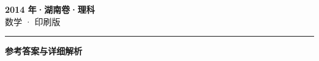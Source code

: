 \documentclass[zihao=5, a4paper]{ctexart}
\begin{document}
\begin{center}
  {\Large\bfseries 2014 年·湖南卷·理科}\\[4pt]
  {\large 数学 · 印刷版}
\end{center}
\medskip
{}

\par\bigskip\hrule\bigskip
{}
\Needspace{0.55\textheight}
\begin{center}{\large\bfseries 参考答案与详细解析}\end{center}
\smallskip

\end{document}
